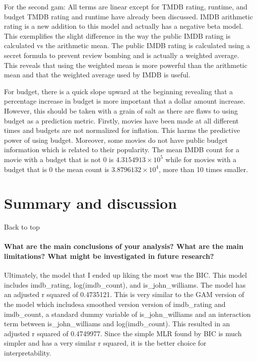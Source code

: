 \documentclass[
]{article}
\begin{document}
For the second gam: All terms are linear except for TMDB rating,
runtime, and budget TMDB rating and runtime have already been discussed.
IMDB arithmetic rating is a new addition to this model and actually has
a negative beta model. This exemplifies the slight difference in the way
the public IMDB rating is calculated vs the arithmetic mean. The public
IMDB rating is calculated using a secret formula to prevent review
bombing and is actually a weighted average. This reveals that using the
weighted mean is more powerful than the arithmetic mean and that the
weighted average used by IMDB is useful.

For budget, there is a quick slope upward at the beginning revealing
that a percentage increase in budget is more important that a dollar
amount increase. However, this should be taken with a grain of salt as
there are flaws to using budget as a prediction metric. Firstly, movies
have been made at all different times and budgets are not normalized for
inflation. This harms the predictive power of using budget. Moreover,
some movies do not have public budget information which is related to
their popularity. The mean IMDB count for a movie with a budget that is
not 0 is \ensuremath{4.3154913\times 10^{5}} while for movies with a
budget that is 0 the mean count is \ensuremath{3.8796132\times 10^{4}},
more than 10 times smaller.

\hypertarget{summary-and-discussion}{%
\section{Summary and discussion}\label{summary-and-discussion}}

Back to top

\hypertarget{what-are-the-main-conclusions-of-your-analysis-what-are-the-main-limitations-what-might-be-investigated-in-future-research}{%
\paragraph{What are the main conclusions of your analysis? What are the
main limitations? What might be investigated in future
research?}\label{what-are-the-main-conclusions-of-your-analysis-what-are-the-main-limitations-what-might-be-investigated-in-future-research}}

Ultimately, the model that I ended up liking the most was the BIC. This
model includes imdb\_rating, log(imdb\_count), and is\_john\_williams.
The model has an adjusted r squared of 0.4735121. This is very similar
to the GAM version of the model which includesa smoothed version version
of imdb\_rating and imdb\_count, a standard dummy variable of
is\_john\_williams and an interaction term between is\_john\_williams
and log(imdb\_count). This resulted in an adjusted r squared of
0.4749977. Since the simple MLR found by BIC is much simpler and has a
very similar r squared, it is the better choice for interpretability.
\end{document}
